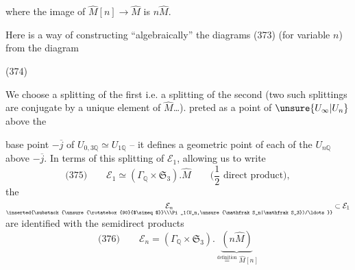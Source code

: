 where the image of $\widehat M[n]\longrightarrow\widehat M$ is $n\widehat M$.

Here is  a way of constructing ``algebraically'' the diagrams (373) (for variable $n$) from the diagram

\begin{samepage}
\noindent (374)
\end{samepage}

We choose a  splitting of the first i.e. a splitting of the second (two such splittings are conjugate by a unique element of $\widehat M$\ldots).
 preted as a  point of $\unsure{U_\infty|U_n}$ above the


base point $-\overline j$ of $U_{0,3\mathbb Q}\simeq U_{1\mathbb Q}$ -- it defines a geometric point of each of the $U_{n\mathbb Q}$ above $-\overline j$. In terms of this splitting of $\mathcal E_1$, allowing us to write
\[
\text{(375)}\qquad \mathcal E_1\simeq(\Gamma_{\mathbb Q}\times\mathfrak S_3).\widehat M
\qquad\text{($\frac12$ direct product)},
\]
the $\underset{\inserted{\substack{\unsure{\rotatebox{90}{$\simeq$}}\\\Pi_1(U_n,\unsure{\mathfrak S_n|\mathfrak S_3})/\ldots}}}{\mathcal E_n}\subset\mathcal E_1$ are identified with the semidirect products
\[
\text{(376)}\qquad \mathcal E_n=(\Gamma_{\mathbb Q}\times\mathfrak S_3).
\underbrace{(n\widehat M)}_{\overset{\text{definition}}{=}\widehat M[n]}
\]

